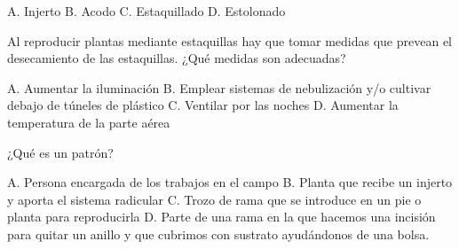 \documentclass[11pt]{exam}
\begin{document}
{\begin{questions}
\begin{checkboxes}
    \choice A. Injerto
    \CorrectChoice B. Acodo
    \choice C. Estaquillado
    \choice D. Estolonado
  \end{checkboxes}
\question Al reproducir plantas mediante estaquillas hay que tomar medidas que prevean el
  desecamiento de las estaquillas. ¿Qué medidas son adecuadas?
  \begin{checkboxes}
    \choice A. Aumentar la iluminación
    \CorrectChoice B. Emplear sistemas de nebulización y/o cultivar debajo de túneles de
    plástico
    \choice C. Ventilar por las noches
    \choice D. Aumentar la  temperatura de la parte aérea
  \end{checkboxes}
\question ¿Qué es un patrón?
  \begin{checkboxes}
  \choice A. Persona encargada de los trabajos en el campo
  \CorrectChoice  B. Planta que recibe un injerto y aporta el sistema radicular
  \choice C. Trozo de rama que se introduce en un pie o planta para reproducirla
  \choice D. Parte de una rama en la que hacemos una incisión para quitar un
  anillo y que cubrimos con sustrato ayudándonos de una bolsa.
  \end{checkboxes}
\end{questions}}
\end{document}
